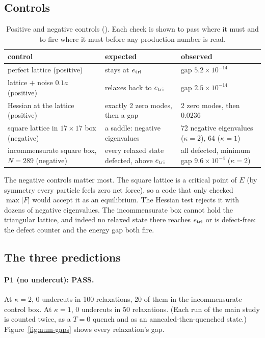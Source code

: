 \subsection{Controls}
\begin{table}[h]\centering\small
\begin{tabular}{p{}p{}p{}}
\toprule
control & expected & observed\\
\midrule
perfect lattice (positive) & stays at $e_{\rm tri}$ & gap $5.2\times10^{-14}$\\
lattice $+$ noise $0.1a$ (positive) & relaxes back to $e_{\rm tri}$ & gap $2.5\times10^{-14}$\\
Hessian at the lattice (positive) & exactly 2 zero modes, then a gap & 2 zero modes, then $0.0236$\\
square lattice in $17\times17$ box (negative) & a saddle: negative eigenvalues & 72 negative eigenvalues ($\kappa=2$), 64 ($\kappa=1$)\\
incommensurate square box, $N=289$ (negative) & every relaxed state defected, above $e_{\rm tri}$ & all defected, minimum gap $9.6\times10^{-4}$ ($\kappa=2$)\\
\bottomrule
\end{tabular}
\caption{Positive and negative controls (\tierX). Each check is shown to pass where it must and to fire where it must
before any production number is read.}\label{tab:num-controls}
\end{table}
The negative controls matter most. The square lattice is a critical point of $E$ (by symmetry every particle feels zero
net force), so a code that only checked $\max|F|$ would accept it as an equilibrium. The Hessian test rejects it with
dozens of negative eigenvalues. The incommensurate box cannot hold the triangular lattice, and indeed no relaxed state
there reaches $e_{\rm tri}$ or is defect-free: the defect counter and the energy gap both fire.

\subsection{The three predictions}
\paragraph{P1 (no undercut): PASS.} At $\kappa=2$, 0 undercuts in 100 relaxations, 20 of them in the incommensurate
control box. At $\kappa=1$, 0 undercuts in 50 relaxations. (Each run of the main study is counted twice, as a $T=0$
quench and as an annealed-then-quenched state.) Figure~\ref{fig:num-gaps} shows every relaxation's gap.

